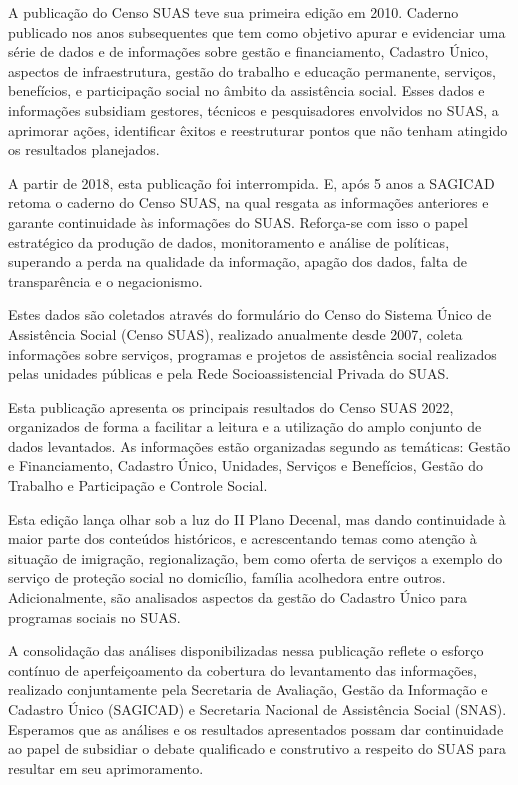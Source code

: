 \documentclass[
  letterpaper,
  DIV=11,
  numbers=noendperiod]{scrreprt}
\begin{document}
A publicação do Censo SUAS teve sua primeira edição em 2010. Caderno
publicado nos anos subsequentes que tem como objetivo apurar e
evidenciar uma série de dados e de informações sobre gestão e
financiamento, Cadastro Único, aspectos de infraestrutura, gestão do
trabalho e educação permanente, serviços, benefícios, e participação
social no âmbito da assistência social. Esses dados e informações
subsidiam gestores, técnicos e pesquisadores envolvidos no SUAS, a
aprimorar ações, identificar êxitos e reestruturar pontos que não tenham
atingido os resultados planejados.

A partir de 2018, esta publicação foi interrompida. E, após 5 anos a
SAGICAD retoma o caderno do Censo SUAS, na qual resgata as informações
anteriores e garante continuidade às informações do SUAS. Reforça-se com
isso o papel estratégico da produção de dados, monitoramento e análise
de políticas, superando a perda na qualidade da informação, apagão dos
dados, falta de transparência e o negacionismo.

Estes dados são coletados através do formulário do Censo do Sistema
Único de Assistência Social (Censo SUAS), realizado anualmente desde
2007, coleta informações sobre serviços, programas e projetos de
assistência social realizados pelas unidades públicas e pela Rede
Socioassistencial Privada do SUAS.

Esta publicação apresenta os principais resultados do Censo SUAS 2022,
organizados de forma a facilitar a leitura e a utilização do amplo
conjunto de dados levantados. As informações estão organizadas segundo
as temáticas: Gestão e Financiamento, Cadastro Único, Unidades, Serviços
e Benefícios, Gestão do Trabalho e Participação e Controle Social.

Esta edição lança olhar sob a luz do II Plano Decenal, mas dando
continuidade à maior parte dos conteúdos históricos, e acrescentando
temas como atenção à situação de imigração, regionalização, bem como
oferta de serviços a exemplo do serviço de proteção social no domicílio,
família acolhedora entre outros. Adicionalmente, são analisados aspectos
da gestão do Cadastro Único para programas sociais no SUAS.

A consolidação das análises disponibilizadas nessa publicação reflete o
esforço contínuo de aperfeiçoamento da cobertura do levantamento das
informações, realizado conjuntamente pela Secretaria de Avaliação,
Gestão da Informação e Cadastro Único (SAGICAD) e Secretaria Nacional de
Assistência Social (SNAS). Esperamos que as análises e os resultados
apresentados possam dar continuidade ao papel de subsidiar o debate
qualificado e construtivo a respeito do SUAS para resultar em seu
aprimoramento.
\end{document}
